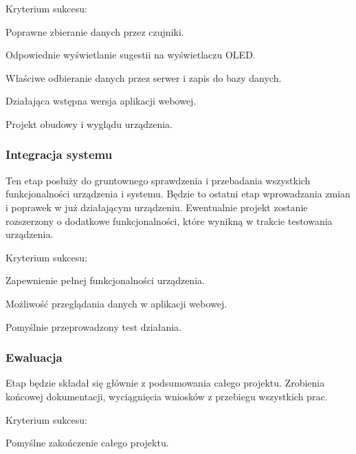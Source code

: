 \documentclass[10pt, a4paper]{article}
\begin{document}
\begin{description}[font=$\bullet$~\normalfont]
\item Kryterium sukcesu:
	\begin{description}[font=$\bullet$~\normalfont]
	\item Poprawne zbieranie danych przez czujniki.
	\item Odpowiednie wyświetlanie sugestii na wyświetlaczu OLED.
	\item Właściwe odbieranie danych przez serwer i zapis do bazy danych.
	\item Działająca wstępna wersja aplikacji webowej.
	\item Projekt obudowy i wyglądu urządzenia.
	\end{description}
\end{description}


\subsubsection{Integracja systemu}
Ten etap posłuży do gruntownego sprawdzenia i przebadania wszystkich funkcjonalności urządzenia i systemu. Będzie to ostatni etap wprowadzania zmian i poprawek w już działającym urządzeniu. Ewentualnie projekt zostanie rozszerzony o dodatkowe funkcjonalności, które wynikną w trakcie testowania urządzenia.

\begin{description}[font=$\bullet$~\normalfont]
\item Kryterium sukcesu:
	\begin{description}[font=$\bullet$~\normalfont]
	\item Zapewnienie pełnej funkcjonalności urządzenia.
	\item Możliwość przeglądania danych w aplikacji webowej.
	\item Pomyślnie przeprowadzony test działania.
	\end{description}
\end{description}


\subsubsection{Ewaluacja}
Etap będzie składał się głównie z podsumowania całego projektu. Zrobienia końcowej dokumentacji, wyciągnięcia wniosków z przebiegu wszystkich prac.
\begin{description}[font=$\bullet$~\normalfont]
\item Kryterium sukcesu:
	\begin{description}[font=$\bullet$~\normalfont]
	\item Pomyślne zakończenie całego projektu.
	\end{description}
\end{description}
\end{document}
